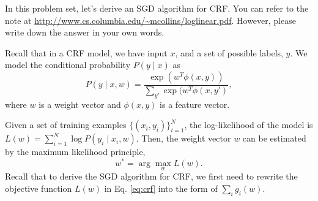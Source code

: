 In this problem set, let's derive an SGD algorithm for CRF. You can refer to the note at \url{http://www.cs.columbia.edu/~mcollins/loglinear.pdf}. However, please write down the answer in your own words.

Recall that in a CRF model, we have input $x$, and a set of possible labels, $y$. We model the conditional probability $P(y\mid x)$ as
\begin{equation}
    P(y\mid x, w) = \frac{\exp(w^T\phi(x,y))}{\sum_{y'} \exp(w^T\phi(x,y')},
\end{equation}
where $w$ is a weight vector and $\phi(x,y)$ is a feature vector.

Given a set of training examples $\{(x_i, y_i)\}_{i=1}^N$, the log-likelihood of the model is $L(w) = \sum_{i=1}^N \log P(y_i\mid x_i, w)$. Then,
the weight vector $w$ can be estimated by the maximum likelihood principle,
\begin{equation}
\label{eq:crf}
    w^* = \arg\max_{w} L(w).
\end{equation}
Recall that to derive the SGD  algorithm for CRF, we first need to rewrite the objective function $L(w)$ in Eq. \eqref{eq:crf} into the form of $\sum_i g_i(w)$.


